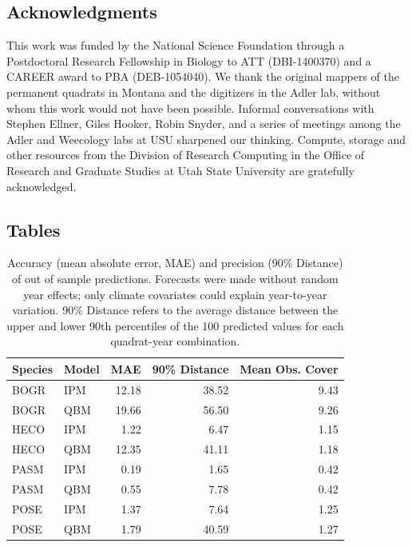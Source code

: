 \documentclass[12pt,]{article}
\begin{document}
\subsection{Acknowledgments}\label{acknowledgments}

This work was funded by the National Science Foundation through a
Postdoctoral Research Fellowship in Biology to ATT (DBI-1400370) and a
CAREER award to PBA (DEB-1054040). We thank the original mappers of the
permanent quadrats in Montana and the digitizers in the Adler lab,
without whom this work would not have been possible. Informal
conversations with Stephen Ellner, Giles Hooker, Robin Snyder, and a
series of meetings among the Adler and Weecology labs at USU sharpened
our thinking. Compute, storage and other resources from the Division of
Research Computing in the Office of Research and Graduate Studies at
Utah State University are gratefully acknowledged.

\pagebreak{}

\subsection{Tables}\label{tables}

\begin{table}[ht]
\centering
\caption{Accuracy (mean absolute error, MAE) and precision (90\% Distance) of out of sample predictions. Forecasts were made without random year effects; only climate covariates could explain year-to-year variation. 90\% Distance refers to the average distance between the upper and lower 90th percentiles of the 100 predicted values for each quadrat-year combination.} 
\begin{tabular}{llrrr}
  \hline
Species & Model & MAE & 90\% Distance & Mean Obs. Cover \\ 
  \hline
BOGR & IPM & 12.18 & 38.52 & 9.43 \\ 
  BOGR & QBM & 19.66 & 56.50 & 9.26 \\ 
  HECO & IPM & 1.22 & 6.47 & 1.15 \\ 
  HECO & QBM & 12.35 & 41.11 & 1.18 \\ 
  PASM & IPM & 0.19 & 1.65 & 0.42 \\ 
  PASM & QBM & 0.55 & 7.78 & 0.42 \\ 
  POSE & IPM & 1.37 & 7.64 & 1.25 \\ 
  POSE & QBM & 1.79 & 40.59 & 1.27 \\ 
   \hline
\end{tabular}
\end{table}
\end{document}
